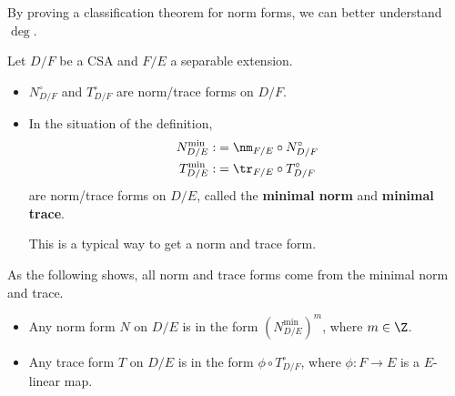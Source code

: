 By proving a classification theorem for norm forms, we can better understand $\deg$.
\begin{ex}
Let $D/F$ be a CSA and $F/E$ a separable extension.
\begin{itemize}
\item
$N_{D/F}^{\circ}$ and $T_{D/F}^{\circ}$ are norm/trace forms on $D/F$. 
\item In the situation of the definition,
\begin{align*}
N_{D/E}^{\text{min}}:&=\nm_{F/E}\circ N_{D/F}^{\circ}\\
T_{D/E}^{\text{min}}:&=\tr_{F/E}\circ T_{D/F}^{\circ}
\end{align*}
are norm/trace forms on $D/E$, 
called the \textbf{minimal norm} and \textbf{minimal trace}.

This is a typical way to get a norm and trace form.
\end{itemize}
\end{ex}
As the following shows, all norm and trace forms come from the minimal norm and trace.
\begin{lem}
\begin{itemize}
\item
Any norm form $N$ on $D/E$ is in the form $(N_{D/E}^{\text{min}})^m$, where $m\in \Z$.
\item
Any trace form $T$ on $D/E$ is in the form $\phi\circ T_{D/F}^{\circ}$, where  $\phi:F\to E$ is a $E$-linear map.
\end{itemize}
\end{lem}
